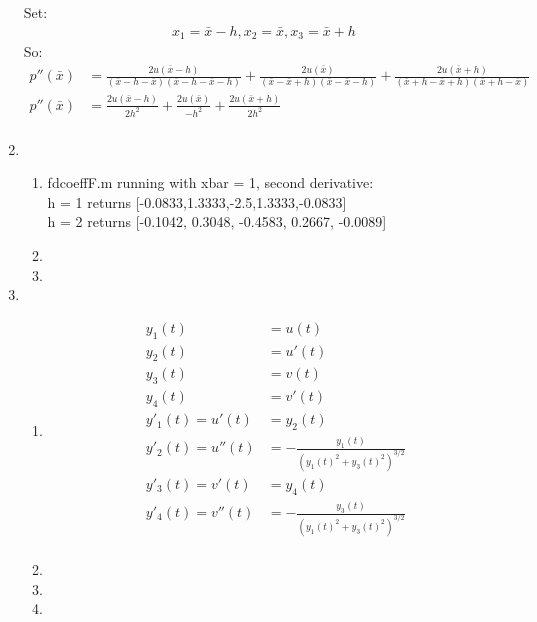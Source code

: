 \documentclass{article}
\begin{document}
\begin{enumerate}
\begin{equation*}
\end{equation*}
Set:
\begin{equation*}
\begin{split}
x_{1} = \bar{x}-h, x_{2} = \bar{x}, x_{3} = \bar{x}+h
\end{split}
\end{equation*}
So:
\begin{equation*}
\begin{split}
p''(\bar{x}) & = \frac{2u(\bar{x}-h)}{(\bar{x}-h-\bar{x})(\bar{x}-h-\bar{x}-h)}+\frac{2u(\bar{x})}{(\bar{x}-\bar{x}+h)(\bar{x}-\bar{x}-h)}+\frac{2u(\bar{x}+h)}{(\bar{x}+h-\bar{x}+h)(\bar{x}+h-\bar{x})}\\
p''(\bar{x}) & = \frac{2u(\bar{x}-h)}{2h^{2}}+\frac{2u(\bar{x})}{-h^{2}}+\frac{2u(\bar{x}+h)}{2h^{2}}\\
\end{split}
\end{equation*}
\item
\begin{enumerate}
\item fdcoeffF.m running with xbar = 1, second derivative: \\
 h = 1 returns [-0.0833,1.3333,-2.5,1.3333,-0.0833] \\
h = 2 returns [-0.1042, 0.3048, -0.4583, 0.2667, -0.0089] 
\item
\item
\end{enumerate}
\item
\begin{enumerate}
\item 
\begin{equation*}
\begin{split}
y_{1}(t) &= u(t) \\
y_{2}(t) & = u'(t) \\
y_{3}(t) &= v(t) \\
y_{4}(t) &= v'(t) \\
y'_{1}(t) = u'(t) &= y_{2}(t) \\
y'_{2}(t) = u''(t) &= -\frac{y_{1}(t)}{(y_{1}(t)^{2}+y_{3}(t)^{2})^{3/2}}  \\
y'_{3}(t) = v'(t) &= y_{4}(t) \\
y'_{4}(t) = v''(t) &= -\frac{y_{3}(t)}{(y_{1}(t)^{2}+y_{3}(t)^{2})^{3/2}}  \\
\end{split}
\end{equation*}
\item
\item
\item

\end{enumerate}
\end{enumerate}
\end{document}
